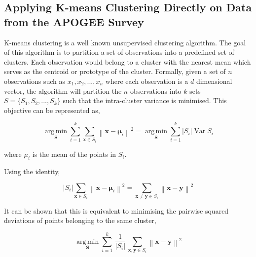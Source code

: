 \subsection{Applying K-means Clustering Directly on Data from the APOGEE Survey}
K-means clustering is a well known unsupervised clustering algorithm. The goal of this algorithm is to partition a set of observations into a predefined set of clusters. Each observation would belong to a cluster with the nearest mean which serves as the centroid or prototype of the cluster\cite{macqueen1967some}. Formally, given a set of $n$ observations such as \(x_1,x_2,...,x_n\) where each observation is a $d$ dimensional vector, the algorithm will partition the $n$ observations into $k$ sets $S=\{S_1,S_2,...,S_k\}$ such that the intra-cluster variance is minimised. This objective can be represented as,

\begin{equation}
{\underset {\mathbf {S} }{\operatorname {arg\,min} }}\sum _{i=1}^{k}\sum _{\mathbf {x} \in S_{i}}\left\|\mathbf {x} -{\boldsymbol {\mu }}_{i}\right\|^{2}={\underset {\mathbf {S} }{\operatorname {arg\,min} }}\sum _{i=1}^{k}|S_{i}|\operatorname {Var} S_{i}
\end{equation}

where $\mu_i$ is the mean of the points in $S_i$. 

Using the identity,

\begin{equation}
    |S_{i}|\sum _{\mathbf {x} \in S_{i}}\left\|\mathbf {x} -{\boldsymbol {\mu }}_{i}\right\|^{2}=\sum _{\mathbf {x} \neq \mathbf {y} \in S_{i}}\left\|\mathbf {x} -\mathbf {y} \right\|^{2}
\end{equation}

It can be shown that this is equivalent to minimising the pairwise squared deviations of points belonging to the same cluster,

\begin{equation}
{\underset {\mathbf {S} }{\operatorname {arg\,min} }}\sum _{i=1}^{k}\,{\frac {1}{|S_{i}|}}\,\sum _{\mathbf {x} ,\mathbf {y} \in S_{i}}\left\|\mathbf {x} -\mathbf {y} \right\|^{2}
\end{equation}

